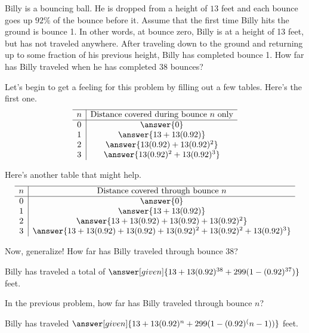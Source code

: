 \documentclass[nooutcomes]{ximera}
\begin{document}
\begin{problem}
Billy is a bouncing ball.  He is dropped from a height of $13$ feet and each bounce goes up $92\%$ of the bounce before it.  Assume that the first time Billy hits the ground is bounce 1.  In other words, at bounce zero, Billy is at a height of 13 feet, but has not traveled anywhere.  After traveling down to the ground and returning up to some fraction of his previous height, Billy has completed bounce 1.  How far has Billy traveled when he has completed $38$ bounces?

Let's begin to get a feeling for this problem by filling out a few tables.  Here's the first one.
\[
\begin{array}{c|c} \hline
n & \text{Distance covered during bounce $n$ only} \\ \hline
0 & \answer{0} \\
1 & \answer{13+13(0.92)} \\
2 & \answer{13(0.92)+13(0.92)^2}\\
3 & \answer{13(0.92)^2 + 13(0.92)^3}\\
\end{array}
\]

Here's another table that might help.
\[
\begin{array}{c|c} \hline
n & \text{Distance covered through bounce $n$} \\ \hline
0 & \answer{0} \\
1 & \answer{13+13(0.92)} \\
2 & \answer{13+13(0.92)+13(0.92)+13(0.92)^2}\\
3 & \answer{13+13(0.92)+13(0.92)+13(0.92)^2+13(0.92)^2 + 13(0.92)^3}\\
\end{array}
\]

Now, generalize!  How far has Billy traveled through bounce $38$?

\begin{prompt}
Billy has traveled a total of $\answer[given]{13+13(0.92)^{38} + 299(1-(0.92)^{37})}$ feet.
\end{prompt}

\end{problem}


\begin{problem}
In the previous problem, how far has Billy traveled through bounce $n$?

\begin{prompt}
Billy has traveled $\answer[given]{13+13(0.92)^n + 299(1-(0.92)^(n-1))}$ feet.
\end{prompt}
\end{problem}
\end{document}
